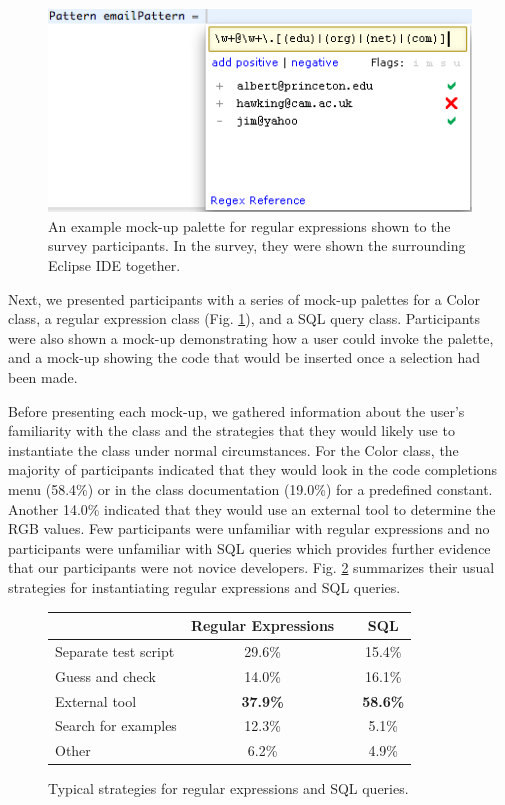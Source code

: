 \documentclass[conference]{IEEEtran}
\begin{document}
\begin{figure}
  \includegraphics[width=\linewidth]{mockup-palette-small.png}
  \caption{An example mock-up palette for regular expressions shown to the survey participants. In the survey, they were shown the surrounding Eclipse IDE together.}
  \label{regex}
\end{figure}

Next, we presented participants with a series of mock-up palettes for a Color class, a regular expression class (Fig. \ref{regex}), and a SQL query class. Participants were also shown a mock-up demonstrating how a user could invoke the palette, and a mock-up showing the code that would be inserted once a selection had been made.

Before presenting each mock-up, we gathered information about the user's familiarity with the class and the strategies that they would likely use to instantiate the class under normal circumstances. For the Color class, the majority of participants indicated that they would look in the code completions menu (58.4\%) or in the class documentation (19.0\%) for a predefined constant. Another 14.0\% indicated that they would use an external tool to determine the RGB values. Few participants were unfamiliar with regular expressions and no participants were unfamiliar with SQL queries which provides further evidence that our participants were not novice developers. Fig. \ref{strategies} summarizes their usual strategies for instantiating regular expressions and SQL queries.

\begin{figure}
\begin{tabular}{lccc}
 & Regular Expressions &  & SQL\\
 \hline
Separate test script & 29.6\% &  & 15.4\%\\
Guess and check & 14.0\% &  & 16.1\%\\
External tool & \textbf{37.9\%} &  & \textbf{58.6\%}\\
Search for examples & 12.3\% & & 5.1\% \\
Other & 6.2\% & & 4.9\% \\
\hline
\end{tabular}
\caption{Typical strategies for regular expressions and SQL queries.}
\label{strategies}
\end{figure}
\end{document}
